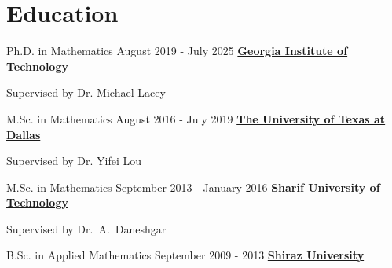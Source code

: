 \documentclass[11pt]{article}
\newenvironment{innerlist}[1][\enskip\textbullet]
        {\begin{compactitem}[#1]}{\end{compactitem}}
\begin{document}
\section{Education}
\vspace{2 mm}
\begin{itemize}
\item  Ph.D. in Mathematics \hfill August 2019 - July 2025
\newline
	\href{https://www.gatech.edu/}{\textbf{Georgia Institute of Technology}}
	\begin{innerlist}[-]
				\item Supervised by Dr. Michael Lacey
	\end{innerlist}

\item M.Sc. in Mathematics \hfill August 2016 - July 2019
\newline
\href{http://www.utdallas.edu/}{\textbf{The University of Texas at Dallas}}

		\begin{innerlist}[-]
		\item Supervised by Dr. Yifei Lou
		\end{innerlist}

\item M.Sc. in Mathematics \hfill September 2013 - January 2016
\newline
\href{http://www.sharif.ir/web/en}{\textbf{Sharif University of Technology}}
        \begin{innerlist}[-]
	      \item Supervised by Dr.~A.~Daneshgar
	    \end{innerlist}


\item B.Sc. in Applied Mathematics \hfill September 2009 - 2013
\newline
\href{http://shirazu.ac.ir/en}{\textbf{Shiraz University}}

\end{itemize}
\end{document}
